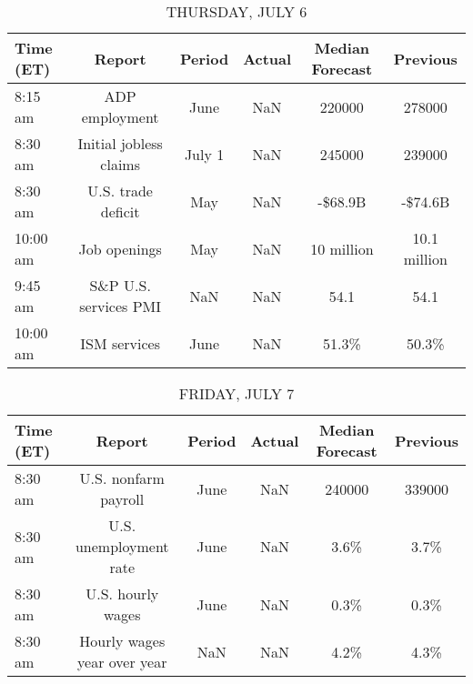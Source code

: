 \documentclass{article}%
\begin{document}
%


\begin{table}[htbp]%
\caption{THURSDAY, JULY 6}%
\centering%
\begin{adjustbox}{width=1\textwidth}%
\begin{tabular}{lccccc}
\toprule
Time (ET) &                 Report & Period & Actual & Median Forecast &     Previous \\
\midrule
  8:15 am &         ADP employment &   June &    NaN &          220000 &       278000 \\
  8:30 am & Initial jobless claims & July 1 &    NaN &          245000 &       239000 \\
  8:30 am &     U.S. trade deficit &    May &    NaN &         -\$68.9B &      -\$74.6B \\
 10:00 am &           Job openings &    May &    NaN &      10 million & 10.1 million \\
  9:45 am &  S\&P U.S. services PMI &    NaN &    NaN &            54.1 &         54.1 \\
 10:00 am &           ISM services &   June &    NaN &           51.3\% &        50.3\% \\
\bottomrule
\end{tabular}
%
\end{adjustbox}%
\end{table}

%


\begin{table}[htbp]%
\caption{FRIDAY, JULY 7}%
\centering%
\begin{adjustbox}{width=1\textwidth}%
\begin{tabular}{lccccc}
\toprule
Time (ET) &                      Report & Period & Actual & Median Forecast & Previous \\
\midrule
  8:30 am &        U.S. nonfarm payroll &   June &    NaN &          240000 &   339000 \\
  8:30 am &      U.S. unemployment rate &   June &    NaN &            3.6\% &     3.7\% \\
  8:30 am &           U.S. hourly wages &   June &    NaN &            0.3\% &     0.3\% \\
  8:30 am & Hourly wages year over year &    NaN &    NaN &            4.2\% &     4.3\% \\
\bottomrule
\end{tabular}
%
\end{adjustbox}%
\end{table}
\end{document}
